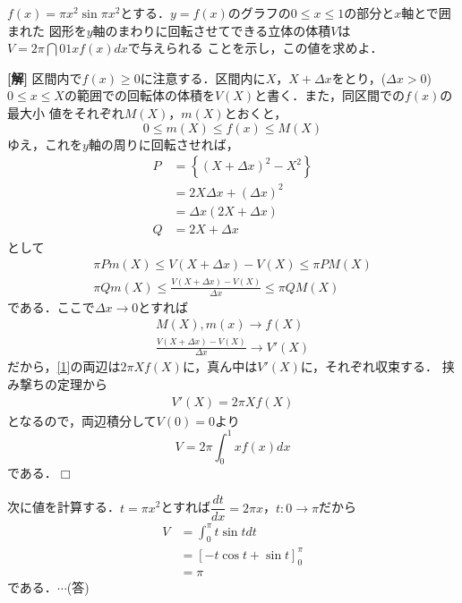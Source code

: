 \documentclass[a4j]{jarticle}
\begin{document}

     \begin{oframed}
     $f(x)=\pi x^2\sin\pi x^2$とする．$y=f(x)$のグラフの$0\le x\le1$の部分と$x$軸とで囲まれた
     図形を$y$軸のまわりに回転させてできる立体の体積$V$は$V=2\pi\dint{0}{1}xf(x)dx$で与えられる
     ことを示し，この値を求めよ．
     \end{oframed}

\setlength{\columnseprule}{0.4pt}
\begin{multicols}{2}
{\bf[解]} 区間内で$f(x)\ge0$に注意する．区間内に$X$，$X+\Delta x$をとり，($\Delta x>0$)
$0\le x\le X$の範囲での回転体の体積を$V(X)$と書く．また，同区間での$f(x)$の最大小
値をそれぞれ$M(X)$，$m(X)$とおくと，
     \[0\le m(X)\le f(x)\le M(X) \]
ゆえ，これを$y$軸の周りに回転させれば，
     \begin{align*}
     P&=\left\{(X+\Delta x)^2-X^2\right\}\\
     &=2X\Delta x+(\Delta x)^2 \\
     &=\Delta x(2X+\Delta x) \\
     Q&=2X+\Delta x
     \end{align*}
として
     \begin{align}
     \pi Pm(X)\le V(X+\Delta x)-V(X)\le\pi PM(X) \nonumber\\
     \pi Qm(X)\le \frac{V(X+\Delta x)-V(X)}{\Delta x}\le \pi QM(X) \label{1}
     \end{align}
である．ここで$\Delta x\to0$とすれば
     \begin{align*}
     M(X),m(x)\to f(X) \\
     \frac{V(X+\Delta x)-V(X)}{\Delta x}\to V'(X)
     \end{align*}
だから，\eqref{1}の両辺は$2\pi Xf(X)$に，真ん中は$V'(X)$に，それぞれ収束する．
挟み撃ちの定理から
     \begin{align*}
     V'(X)=2\pi Xf(X)
     \end{align*}
となるので，両辺積分して$V(0)=0$より
     \[V=2\pi\int_0^1xf(x)dx\]
である．$\Box$　　     

次に値を計算する．$t=\pi x^2$とすれば$\dfrac{dt}{dx}=2\pi x$，$t:0\to\pi$だから
     \begin{align*}
     V&=\int_0^\pi t\sin tdt \\
     &=\left[-t\cos t+\sin t\right]_0^\pi \\
     &=\pi
     \end{align*}
である．$\cdots$(答)
\newpage
\end{multicols}
\end{document}
